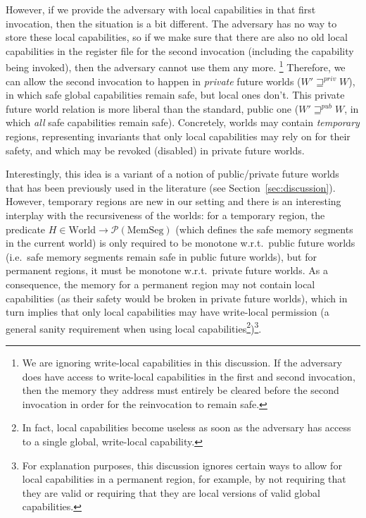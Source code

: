 \documentclass[format=acmsmall, review=false, screen=true]{acmart}
\renewcommand{\sectionname}{Section}
\newcommand{\powerset}[1]{\mathcal{P}(#1)}
\newcommand{\var}[1]{\mathit{#1}}
\newcommand{\futurewk}{\mathbin{\sqsupseteq}^{\var{pub}}}
\newcommand{\futurestr}{\mathbin{\sqsupseteq}^{\var{priv}}}
\newcommand{\plaindom}[1]{\mathrm{#1}}
\newcommand{\HeapSegments}{\plaindom{MemSeg}}
\newcommand{\MemSegments}{\HeapSegments}
\newcommand{\Worlds}{\plaindom{World}}
\newenvironment{toplas}
    {\color{OliveGreen}
          
    }{}
\begin{document}
\begin{toplas}
However, if we provide the adversary with local capabilities in that first
invocation, then the situation is a bit different. The adversary has no way to
store these local capabilities, so if we make sure that there are also no old
local capabilities in the register file for the second invocation (including the
capability being invoked), then the adversary cannot use them any more.%
\footnote{We are ignoring write-local capabilities in this discussion. If the
  adversary does have access to write-local capabilities in the first and second
  invocation, then the memory they address must entirely be cleared before the
  second invocation in order for the reinvocation to remain safe.} Therefore, we
can allow the second invocation to happen in \emph{private} future worlds ($W'
\futurestr W$), in which safe global capabilities remain safe, but local ones
don't. This private future world relation is more liberal than the standard,
public one ($W' \futurewk W$, in which \emph{all} safe capabilities remain
safe). Concretely, worlds may contain \emph{temporary} regions, representing
invariants that only local capabilities may rely on for their safety, and which
may be revoked (disabled) in private future worlds.

Interestingly, this idea is a variant of a notion of public/private future
worlds that has been previously used in the literature (see
\sectionname~\ref{sec:discussion}). However, temporary regions are new in our setting
and there is an interesting interplay with the recursiveness of the worlds: for
a temporary region, the predicate $H \in \Worlds \rightarrow
\powerset{\MemSegments}$ (which defines the safe memory segments in the
current world) is only required to be monotone w.r.t.\ public
future worlds (i.e.\ safe memory segments remain safe in public future worlds),
but for permanent regions, it must be monotone w.r.t.\ private future worlds.
As a consequence, the memory for a permanent region may not contain local
capabilities (as their safety would be broken in private future worlds), which
in turn implies that only local capabilities may have write-local permission (a
general sanity requirement when using local capabilities\footnote{In fact, local
  capabilities become useless as soon as the adversary has access to a single
  global, write-local capability.})\footnote{For explanation purposes, this
  discussion ignores certain ways to allow for local capabilities in a permanent
  region, for example, by not requiring that they are valid or requiring that
  they are local versions of valid global capabilities.}.
\end{toplas}
\end{document}
